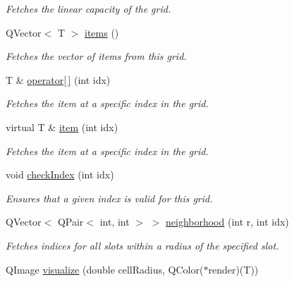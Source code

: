 \begin{DoxyCompactItemize}
\begin{DoxyCompactList}\small\item\em \-Fetches the linear capacity of the grid. \end{DoxyCompactList}\item 
\hypertarget{classhsom_1_1_grid_ae6b6ffb72e86c3904e8ac21253d85a24}{\-Q\-Vector$<$ \-T $>$ \hyperlink{classhsom_1_1_grid_ae6b6ffb72e86c3904e8ac21253d85a24}{items} ()}\label{classhsom_1_1_grid_ae6b6ffb72e86c3904e8ac21253d85a24}

\begin{DoxyCompactList}\small\item\em \-Fetches the vector of items from this grid. \end{DoxyCompactList}\item 
\-T \& \hyperlink{classhsom_1_1_grid_ac4d7188e7b75823a03a53317656473fa}{operator\mbox{[}$\,$\mbox{]}} (int idx)
\begin{DoxyCompactList}\small\item\em \-Fetches the item at a specific index in the grid. \end{DoxyCompactList}\item 
virtual \-T \& \hyperlink{classhsom_1_1_grid_a991f2eb04dc799ef42c8b58868b9cb8f}{item} (int idx)
\begin{DoxyCompactList}\small\item\em \-Fetches the item at a specific index in the grid. \end{DoxyCompactList}\item 
void \hyperlink{classhsom_1_1_grid_ac61a8700e1e4a3662642d30800046ebb}{check\-Index} (int idx)
\begin{DoxyCompactList}\small\item\em \-Ensures that a given index is valid for this grid. \end{DoxyCompactList}\item 
\-Q\-Vector$<$ \-Q\-Pair$<$ int, int $>$ $>$ \hyperlink{classhsom_1_1_grid_ae957e549123565f3709ad25d9d8c559b}{neighborhood} (int r, int idx)
\begin{DoxyCompactList}\small\item\em \-Fetches indices for all slots within a radius of the specified slot. \end{DoxyCompactList}\item 
\hypertarget{classhsom_1_1_grid_ad45b81e9f494b7d41a8b8a1691be2c8c}{\-Q\-Image \hyperlink{classhsom_1_1_grid_ad45b81e9f494b7d41a8b8a1691be2c8c}{visualize} (double cell\-Radius, \-Q\-Color($\ast$render)(\-T))}\label{classhsom_1_1_grid_ad45b81e9f494b7d41a8b8a1691be2c8c}


\end{DoxyCompactItemize}

